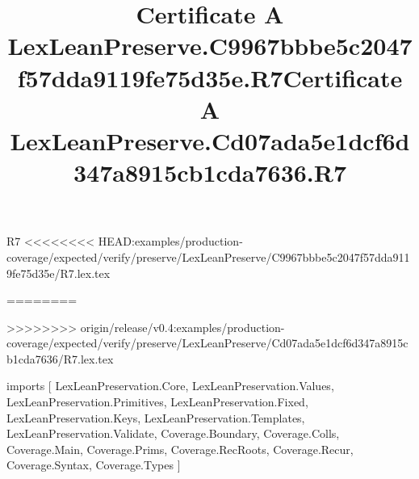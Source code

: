 \begin{lexlean}{R7}
<<<<<<<< HEAD:examples/production-coverage/expected/verify/preserve/LexLeanPreserve/C9967bbbe5c2047f57dda9119fe75d35e/R7.lex.tex
\title{Certificate A LexLeanPreserve.C9967bbbe5c2047f57dda9119fe75d35e.R7}
========
\title{Certificate A LexLeanPreserve.Cd07ada5e1dcf6d347a8915cb1cda7636.R7}
>>>>>>>> origin/release/v0.4:examples/production-coverage/expected/verify/preserve/LexLeanPreserve/Cd07ada5e1dcf6d347a8915cb1cda7636/R7.lex.tex
\begin{coremodule}
imports [
  LexLeanPreservation.Core,
  LexLeanPreservation.Values,
  LexLeanPreservation.Primitives,
  LexLeanPreservation.Fixed,
  LexLeanPreservation.Keys,
  LexLeanPreservation.Templates,
  LexLeanPreservation.Validate,
  Coverage.Boundary,
  Coverage.Colls,
  Coverage.Main,
  Coverage.Prims,
  Coverage.RecRoots,
  Coverage.Recur,
  Coverage.Syntax,
  Coverage.Types
]


\end{coremodule}
\end{lexlean}
